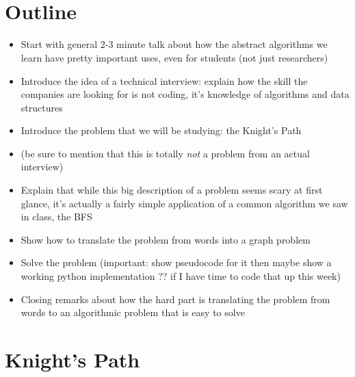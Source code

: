 \documentclass[11pt]{exam}
\begin{document}
\\

\\

\section*{Outline}

\begin{itemize}

\item Start with general 2-3 minute talk about how the abstract algorithms we learn have pretty important uses, even for students (not just researchers)

\item Introduce the idea of a technical interview: explain how the skill the companies are looking for is not coding, it's knowledge of algorithms and data structures

\item Introduce the problem that we will be studying: the Knight's Path

\item (be sure to mention that this is totally {\it not} a problem from an actual interview)

\item Explain that while this big description of a problem seems scary at first glance, it's actually a fairly simple application of a common algorithm we saw in class, the BFS

\item Show how to translate the problem from words into a graph problem

\item Solve the problem (important: show pseudocode for it then maybe show a working python implementation ?? if I have time to code that up this week)

\item Closing remarks about how the hard part is translating the problem from words to an algorithmic problem that is easy to solve

\end{itemize}


\section*{Knight's Path}
\end{document}
